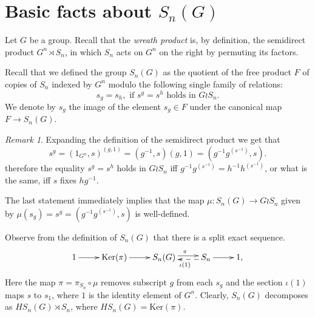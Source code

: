 \documentclass[oneside, 10pt]{amsart}
\theoremstyle{plain}
\numberwithin{equation}{section}
\numberwithin{lemma}{section}
\theoremstyle{remark}
\newtheorem{rem}[lemma]{Remark}
\theoremstyle{definition}
\begin{document}
\section{Basic facts about $S_n(G)$} 
Let $G$ be a group. Recall that the {\it wreath product} is, by definition,
the semidirect product $G^n \rtimes S_n$, in which $S_n$ acts on $G^n$ on the right by permuting its factors.
\begin{comment}
Consider the family $\{{S_n}^{(g)}\}_{g\in G^n}$ of isomorphic copies of $S_n$ indexed by elements of $G^n$ and let $F$ be the free product of groups from this family.
For $s\in S_n$ and $g\in G^n$ we denote by 
$s_{g}$ the image of $s$ in $F$ under the canonical map $S_n^{(g)} \to F$.
\end{comment}
Recall that we defined the group $S_n(G)$ as the quotient of the free product $F$ of copies of $S_n$ indexed by $G^n$ modulo the following single family of relations:
\begin{equation} \label{eq:main_rel} s_{g} = s_{h}, \text{ if $s^g = s^h$ holds in $G \wr S_n$.} \end{equation}
We denote by $s_g$ the image of the element $s_g\in F$ under the canonical map $F\to S_n(G)$.

\begin{rem}
Expanding the definition of the semidirect product we get that
\begin{equation} \nonumber s^g = (1_{G^n}, s)^{(g, 1)} = (g^{-1}, s) (g, 1) = (g^{-1} g^{(s^{-1})}, s). \end{equation}
therefore the equality $s^g = s^h$ holds in $G \wr S_n$ iff
$g^{-1} g^{(s^{-1})} = h^{-1} h^{(s^{-1})}$, or what is the same, iff $s$ fixes $hg^{-1}$.

The last statement immediately implies that the map $\mu \colon S_n(G) \to G \wr S_n$ given by $\mu(s_g) = s^g = (g^{-1}g^{(s^{-1})}, s)$
is well-defined. %
\end{rem}

Observe from the definition of $S_n(G)$ that there is a split exact sequence.
\begin{equation} \label{eq:ex-seq} \xymatrix{1 \ar[r] & \mathrm{Ker}(\pi) \ar[r] &  S_n(G) \ar@<0.5ex>[r]^{\pi} & S_n \ar[r] \ar@{-->}@<0.5ex>[l]^{\iota(1)} & 1,} \end{equation}
Here the map $\pi = \pi_{S_n} \circ \mu$ removes subscript $g$ from each $s_g$ and the section $\iota(1)$ maps $s$ to $s_1$, where $1$ is the identity element of $G^n$.
Clearly, $S_n(G)$ decomposes as $HS_n(G) \rtimes S_n$, where $HS_n(G) = \mathrm{Ker}(\pi)$.
\end{document}
